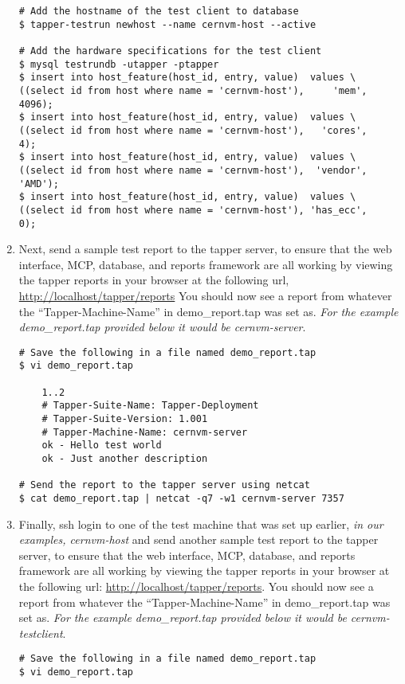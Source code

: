 \begin{enumerate}
\lstset{caption= Adding Test Clients to Tapper Database}
\begin{lstlisting}
# Add the hostname of the test client to database
$ tapper-testrun newhost --name cernvm-host --active

# Add the hardware specifications for the test client
$ mysql testrundb -utapper -ptapper
$ insert into host_feature(host_id, entry, value)  values \
((select id from host where name = 'cernvm-host'),     'mem',  4096);
$ insert into host_feature(host_id, entry, value)  values \
((select id from host where name = 'cernvm-host'),   'cores',     4);
$ insert into host_feature(host_id, entry, value)  values \
((select id from host where name = 'cernvm-host'),  'vendor', 'AMD');
$ insert into host_feature(host_id, entry, value)  values \
((select id from host where name = 'cernvm-host'), 'has_ecc',     0);
\end{lstlisting}


\item 	Next, send a sample test report to the tapper server, to ensure that the web interface, MCP, database, and reports
		framework are all working by viewing the tapper reports in your browser at the following url, 
		\url{http://localhost/tapper/reports} You should now see a report from whatever the ``Tapper-Machine-Name'' in 
		demo\_report.tap was set as. \emph{For the example demo\_report.tap provided below it would be cernvm-server}.
\lstset{caption= Send a Report from the \tapper~Server to Itself}
\begin{lstlisting}
# Save the following in a file named demo_report.tap
$ vi demo_report.tap

	1..2
	# Tapper-Suite-Name: Tapper-Deployment
	# Tapper-Suite-Version: 1.001
	# Tapper-Machine-Name: cernvm-server
	ok - Hello test world
	ok - Just another description

# Send the report to the tapper server using netcat
$ cat demo_report.tap | netcat -q7 -w1 cernvm-server 7357
\end{lstlisting}

\item 	Finally, ssh login to one of the test machine that was set up earlier, \emph{in our examples, cernvm-host} and send another 
		sample test report to the tapper server, to ensure that the web interface, MCP, database, and reports framework are all working 
		by viewing the tapper reports in your browser at the following url: \url{http://localhost/tapper/reports}. You should now see a 
		report from whatever the ``Tapper-Machine-Name'' in demo\_report.tap was set as. \emph{For the example demo\_report.tap provided 
		below it would be cernvm-testclient}.
\lstset{caption= Send a Report to the \tapper~Server from a Test Client}
\begin{lstlisting}
# Save the following in a file named demo_report.tap
$ vi demo_report.tap


\end{lstlisting}
\end{enumerate}
